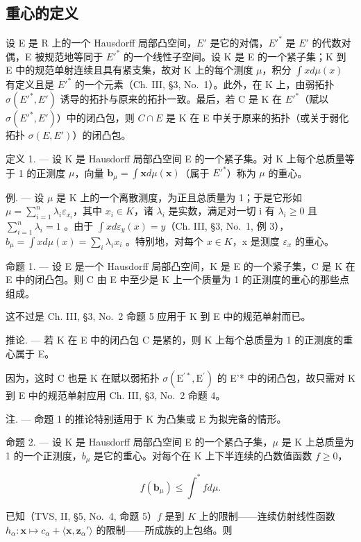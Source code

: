 \subsection{重心的定义}

设 E 是 R 上的一个 Hausdorff 局部凸空间，\(E'\) 是它的对偶，\(E'^{*}\) 是 \(E'\) 的代数对偶，E 被规范地等同于 \(E'^{*}\) 的一个线性子空间。设 K 是 E 的一个紧子集；K 到 E 中的规范单射连续且具有紧支集，故对 K 上的每个测度 \(\mu\)，积分 \(\int x d\mu(x)\) 有定义且是 \(E'^{*}\) 的一个元素（Ch. III, §3, No.~1）。此外，在 K 上，由弱拓扑 \(\sigma(E'^{*}, E')\) 诱导的拓扑与原来的拓扑一致。最后，若 C 是 K 在 \(E'^{*}\)（赋以 \(\sigma(E'^{*}, E')\)）中的闭凸包，则 \(C \cap E\) 是 K 在 E 中关于原来的拓扑（或关于弱化拓扑 \(\sigma(E, E')\)）的闭凸包。

定义 1. --- 设 K 是 Hausdorff 局部凸空间 E 的一个紧子集。对 K 上每个总质量等于 1 的正测度 \(\mu\)，向量 \(\mathbf{b}_{\mu} = \int \mathbf{x} d\mu(\mathbf{x})\)（属于 \(E'^{*}\)）称为 \(\mu\) 的重心。

例. --- 设 \(\mu\) 是 K 上的一个离散测度，为正且总质量为 1；于是它形如 \(\mu = \sum_{i=1}^{n} \lambda_i \varepsilon_{x_i}\)，其中 \(x_i \in K\)，诸 \(\lambda_i\) 是实数，满足对一切 i 有 \(\lambda_i \geqslant 0\) 且 \(\sum_{i=1}^{n} \lambda_i = 1\) 。由于 \(\int x d\varepsilon_y(x) = y\)（Ch. III, §3, No.~1, 例 3），\(b_\mu = \int x d\mu(x) = \sum_{i} \lambda_i x_i\) 。特别地，对每个 \(x \in K\)，x 是测度 \(\varepsilon_x\) 的重心。

命题 1. --- 设 E 是一个 Hausdorff 局部凸空间，K 是 E 的一个紧子集，C 是 K 在 E 中的闭凸包。则 C 由 E 中至少是 K 上一个质量为 1 的正测度的重心的那些点组成。

这不过是 Ch. III, §3, No.~2 命题 5 应用于 K 到 E 中的规范单射而已。

推论. --- 若 K 在 E 中的闭凸包 C 是紧的，则 K 上每个总质量为 1 的正测度的重心属于 E。

因为，这时 C 也是 K 在赋以弱拓扑 \(\sigma (\mathrm{E}^{\prime *},\mathrm{E}^{\prime})\) 的 E'* 中的闭凸包，故只需对 K 到 E 中的规范单射应用 Ch. III, §3, No.~2 命题 4。

注. --- 命题 1 的推论特别适用于 K 为凸集或 E 为拟完备的情形。

命题 2. --- 设 K 是 Hausdorff 局部凸空间 E 的一个紧凸子集，\(\mu\) 是 K 上总质量为 1 的一个正测度，\(b_{\mu}\) 是它的重心。对每个在 K 上下半连续的凸数值函数 \(f \geqslant 0\)，

\[
f (\mathbf {b} _ {\mu}) \leqslant \int^ {*} f d \mu .
\]

已知（TVS, II, §5, No.~4, 命题 5）\(f\) 是到 \(K\) 上的限制——连续仿射线性函数 \(h_{\alpha} : \mathbf{x} \mapsto c_{\alpha} + \langle \mathbf{x}, \mathbf{z}_{\alpha}' \rangle\) 的限制——所成族的上包络。则

